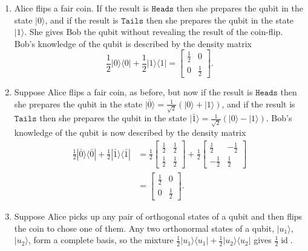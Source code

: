 \documentclass{article}
\begin{document}
\begin{enumerate}
\def\labelenumi{\arabic{enumi}.}
\item
  Alice flips a fair coin.
  If the result is \(\texttt{Heads}\) then she prepares the qubit in the state \(|0\rangle\), and if the result is \(\texttt{Tails}\) then she prepares the qubit in the state \(|1\rangle\).
  She gives Bob the qubit without revealing the result of the coin-flip.
  Bob's knowledge of the qubit is described by the density matrix
  \[
     \frac12|0\rangle\langle 0| + \frac12|1\rangle\langle 1|
     =
     \begin{bmatrix}
       \frac12 & 0
     \\0 & \frac12
     \end{bmatrix}.
   \]
\item
  Suppose Alice flips a fair coin, as before, but now if the result is \(\texttt{Heads}\) then she prepares the qubit in the state \(|\bar{0}\rangle = \frac{1}{\sqrt{2}}(|0\rangle + |1\rangle)\), and if the result is \(\texttt{Tails}\) then she prepares the qubit in the state \(|\bar{1}\rangle = \frac{1}{\sqrt{2}}(|0\rangle - |1\rangle)\).
  Bob's knowledge of the qubit is now described by the density matrix
  \[
     \begin{aligned}
       \frac12|\bar{0}\rangle\langle\bar{0}| + \frac12|\bar{1}\rangle\langle\bar{1}|
       &=
       \frac12
       \begin{bmatrix}
       \frac12 & \frac12
       \\\frac12 & \frac12
       \end{bmatrix}
       +
       \frac12
       \begin{bmatrix}
       \frac12 & -\frac12
       \\-\frac12 & \frac12
       \end{bmatrix}
     \\&=
       \begin{bmatrix}
       \frac12 & 0
       \\0 & \frac12
       \end{bmatrix}.
     \end{aligned}
   \]
\item
  Suppose Alice picks up any pair of orthogonal states of a qubit and then flips the coin to chose one of them.
  Any two orthonormal states of a qubit, \(|u_1\rangle\), \(|u_2\rangle\), form a complete basis, so the mixture \(\frac12|u_1\rangle\langle u_1|+\frac12|u_2\rangle\langle u_2|\) gives \(\frac12\operatorname{id}\).
\end{enumerate}
\end{document}

